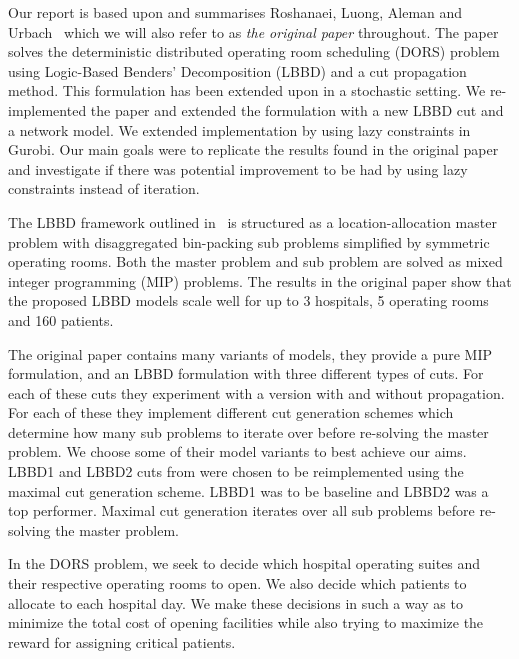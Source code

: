 Our report is based upon and summarises Roshanaei, Luong, Aleman and Urbach~\cite{roshanaei2017propagating} which we will also refer to as \textit{the original paper} throughout. The paper solves the deterministic distributed  operating room scheduling (DORS) problem using Logic-Based Benders' Decomposition (LBBD) and a cut propagation method. This formulation has been extended upon in a stochastic setting\cite{guo}. We re-implemented the paper and extended the formulation with a new LBBD cut and a network model. We extended implementation by using lazy constraints in Gurobi. Our main goals were to replicate the results found in the original paper and investigate if there was potential improvement to be had by using lazy constraints instead of iteration.

The LBBD framework outlined in~\cite{roshanaei2017propagating} is structured as a location-allocation master problem with disaggregated bin-packing sub problems simplified by symmetric operating rooms. Both the master problem and sub problem are solved as mixed integer programming (MIP) problems. The results in the original paper show that the proposed LBBD models scale well for up to 3 hospitals, 5 operating rooms and 160 patients.

The original paper contains many variants of models, they provide a pure MIP formulation, and an LBBD formulation with three different types of cuts. For each of these cuts they experiment with a version with and without propagation. For each of these they implement different cut generation schemes which determine how many sub problems to iterate over before re-solving the master problem. We choose some of their model variants to best achieve our aims. LBBD1 and LBBD2 cuts from \cite{roshanaei2017propagating} were chosen to be reimplemented using the maximal cut generation scheme. LBBD1 was to be baseline and LBBD2 was a top performer. Maximal cut generation iterates over all sub problems before re-solving the master problem.

In the DORS problem, we seek to decide which hospital operating suites and their respective operating rooms to open. We also decide which patients to allocate to each hospital day. We make these decisions in such a way as to minimize the total cost of opening facilities while also trying to maximize the reward for assigning critical patients\cite{roshanaei2017propagating}.